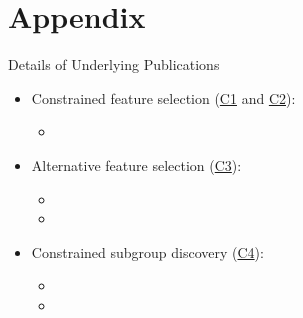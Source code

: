 \documentclass[en, navbarinline, handout]{sdqbeamer}
\begin{document}
\section{Appendix}

\begin{frame}[t]{Details of Underlying Publications}
	\begin{itemize}
		\item Constrained feature selection (\hyperlink{slide:contributions}{C1} and \hyperlink{slide:contributions}{C2}):
		\begin{itemize}
			\item {}
		\end{itemize}
		\item Alternative feature selection (\hyperlink{slide:contributions}{C3}):
		\begin{itemize}
			\item {}
			\item {}
		\end{itemize}
		\item Constrained subgroup discovery (\hyperlink{slide:contributions}{C4}):
		\begin{itemize}
			\item {}
			\item {}
		\end{itemize}
	\end{itemize}
\end{frame}

\backupend
\end{document}
